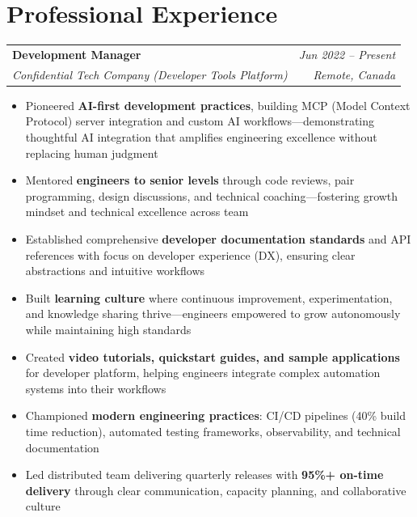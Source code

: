 \documentclass[11pt]{article}
\makeatletter
\newcommand{\tech}[1]{\textcolor{secondary}{\textbf{#1}}}
\newcommand{\experience}[4]{
  \vspace{4pt}
  \begin{tabular*}{\textwidth}{@{}l@{\extracolsep{\fill}}r@{}}
    \textbf{#1} & \textit{#2} \\
    \textit{\small#3} & \textit{\small#4}
  \end{tabular*}
  \vspace{-4pt}
}
\makeatother
\begin{document}
\section*{Professional Experience}

\experience{Development Manager}{Jun 2022 -- Present}{Confidential Tech Company (Developer Tools Platform)}{Remote, Canada}
\begin{itemize}
    \item Pioneered \tech{AI-first development practices}, building MCP (Model Context Protocol) server integration and custom AI workflows—demonstrating thoughtful AI integration that amplifies engineering excellence without replacing human judgment
    \item Mentored \tech{engineers to senior levels} through code reviews, pair programming, design discussions, and technical coaching—fostering growth mindset and technical excellence across team
    \item Established comprehensive \tech{developer documentation standards} and API references with focus on developer experience (DX), ensuring clear abstractions and intuitive workflows
    \item Built \tech{learning culture} where continuous improvement, experimentation, and knowledge sharing thrive—engineers empowered to grow autonomously while maintaining high standards
    \item Created \tech{video tutorials, quickstart guides, and sample applications} for developer platform, helping engineers integrate complex automation systems into their workflows
    \item Championed \tech{modern engineering practices}: CI/CD pipelines (40\% build time reduction), automated testing frameworks, observability, and technical documentation
    \item Led distributed team delivering quarterly releases with \tech{95\%+ on-time delivery} through clear communication, capacity planning, and collaborative culture
\end{itemize}
\end{document}
